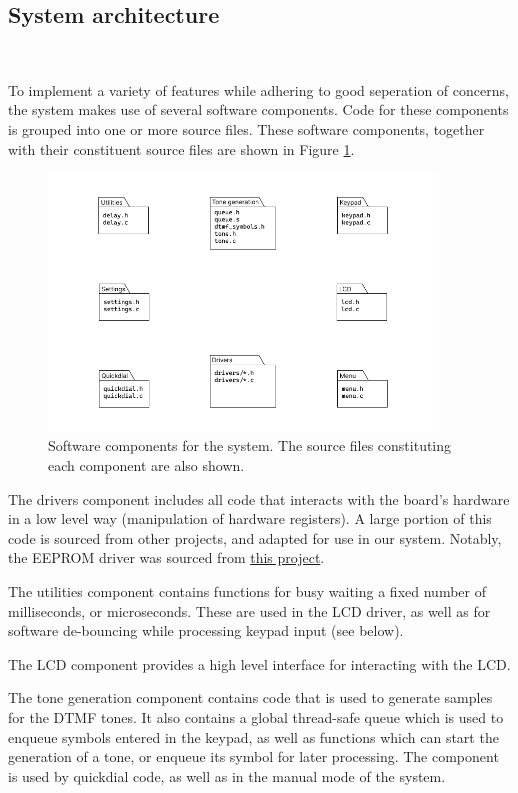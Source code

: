 \documentclass[11pt,a4paper,twocolumn]{scrartcl}
\begin{document}
\subsection{System architecture}~\label{system-arch}

To implement a variety of features while adhering to good seperation of concerns, the system makes use of several software components. Code for these components is grouped into one or more source files. These software components, together with their constituent source files are shown in Figure \ref{fig:software_components}.

\begin{figure}
   \centering
   \includegraphics[width=0.92\textwidth]{software_components}
   \caption{Software components for the system. The source files constituting each component are also shown.}
   \label{fig:software_components}
\end{figure}

The drivers component includes all code that interacts with the board's hardware in a low level way (manipulation of hardware registers). A large portion of this code is sourced from other projects, and adapted for use in our system. Notably, the EEPROM driver was sourced from \href{https://github.com/RT-Thread/realboard-lpc4088/tree/master/software/lpcware_lpc408x/Drivers}{this project}.

The utilities component contains functions for busy waiting a fixed number of milliseconds, or microseconds. These are used in the LCD driver, as well as for software de-bouncing while processing keypad input (see below).

The LCD component provides a high level interface for interacting with the LCD.

The tone generation component contains code that is used to generate samples for the DTMF tones. It also contains a global thread-safe queue which is used to enqueue symbols entered in the keypad, as well as functions which can start the generation of a tone, or enqueue its symbol for later processing. The component is used by quickdial code, as well as in the manual mode of the system.
\end{document}
